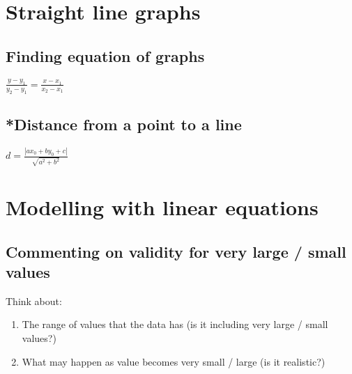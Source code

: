 \section{Straight line graphs}
\subsection{Finding equation of graphs}
$\frac{y-y_1}{y_2-y_1}=\frac{x-x_1}{x_2-x_1}$

\subsection[]{*Distance from a point to a line}
$d=\frac{|ax_0+by_0+c|}{\sqrt{a^2+b^2}}$\\

\section{Modelling with linear equations}
\subsection{Commenting on validity for very large / small values}
Think about:
\begin{enumerate}
    \item The range of values that the data has (is it including very large / small values?)
    \item What may happen as value becomes very small / large (is it realistic?)
\end{enumerate}